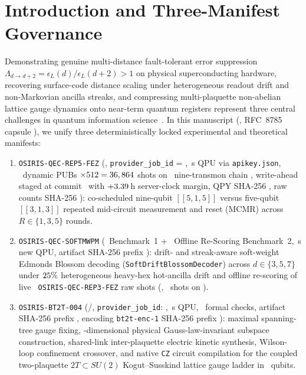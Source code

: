 \documentclass[aps,prx,twocolumn,superscriptaddress,nofootinbib]{revtex4-2}
\begin{document}
\section{Introduction and Three-Manifest Governance}
Demonstrating genuine multi-distance fault-tolerant error suppression $\Lambda_{d \to d+2} = \epsilon_L(d)/\epsilon_L(d+2) > 1$ on physical superconducting hardware, recovering surface-code distance scaling under heterogeneous readout drift and non-Markovian ancilla streaks, and compressing multi-plaquette non-abelian lattice gauge dynamics onto near-term quantum registers represent three central challenges in quantum information science~\cite{GoogleSurface2023,GoogleWillow2025,MiaoLeakage2023,EdmondsBlossom1965,KogutSusskind1975,DavisPaper9Zenodo2026,DavisPaper10Zenodo2026}. In this manuscript (\rfsPaperId, RFC~8785 capsule \rfsCapsuleSha), we unify three deterministically locked experimental and theoretical manifests:
\begin{enumerate}
  \item \texttt{OSIRIS-QEC-REP5-FEZ} (\rfsHwTier, \texttt{provider\_job\_id} = \rfsRepFiveJobId, \rfsRepFiveQpuSec\,s QPU via \texttt{apikey.json}, \rfsRepFiveTotalPubs\ dynamic PUBs $\times 512 = 36,864$ shots on \rfsBackend\ nine-transmon chain \rfsRepFiveChain, write-ahead staged at commit \rfsRepFiveStagedCommit\ with $+3.39$\,h server-clock margin, QPY SHA-256 \rfsRepFiveQpyShaFull, raw counts SHA-256 \rfsRepFiveRawGzShaFull): co-scheduled nine-qubit $[[5,1,5]]$ versus five-qubit $[[3,1,3]]$ repeated mid-circuit measurement and reset (MCMR) across $R \in \{1, 3, 5\}$ rounds.
  \item \texttt{OSIRIS-QEC-SOFTMWPM} (\rfsSimTier\ Benchmark~1 + \rfsHwTier\ Offline Re-Scoring Benchmark~2, \rfsSimQpuSec\,s new QPU, artifact SHA-256 prefix \rfsSoftRepShaPrefix): drift- and streak-aware soft-weight Edmonds Blossom decoding (\texttt{SoftDriftBlossomDecoder}) across $d \in \{3, 5, 7\}$ under $25\%$ heterogeneous heavy-hex hot-ancilla drift and offline re-scoring of live \rfsBackend\ \texttt{OSIRIS-QEC-REP3-FEZ} raw shots (\rfsSoftFezRepThreeJobId, \rfsSoftFezTotalShots\ shots on \rfsSoftFezChain).
  \item \texttt{OSIRIS-BT2T-004} (\rfsSimTier/\rfsProxyTier, \texttt{provider\_job\_id}: \rfsSimJobId, \rfsSimQpuSec\,s QPU, \rfsBtFormalChecks\ formal checks, artifact SHA-256 prefix \rfsBtManShaPrefix, encoding \texttt{bt2t-enc-1} SHA-256 prefix \rfsBtEncShaPrefix): maximal spanning-tree gauge fixing, \rfsBtPhysSubspaceDim-dimensional physical Gauss-law-invariant subspace construction, shared-link inter-plaquette electric kinetic synthesis, Wilson-loop confinement crossover, and native \texttt{CZ} circuit compilation for the coupled two-plaquette $2T \subset SU(2)$ Kogut--Susskind lattice gauge ladder in \rfsBtGaugeFixedQubits\ qubits.
\end{enumerate}
\end{document}
